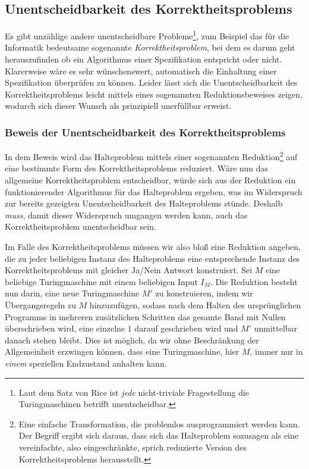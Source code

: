 \subsection{Unentscheidbarkeit des Korrektheitsproblems}
%
Es gibt unzählige andere unentscheidbare Probleme\footnote{Laut dem Satz von Rice ist \emph{jede} nicht-triviale Fragestellung die Turingmaschinen betrifft unentscheidbar.}, zum Beispiel das für die Informatik bedeutsame sogenannte \emph{Korrektheitsproblem}, bei dem es darum geht herauszufinden ob ein Algorithmus einer Spezifikation entspricht oder nicht. Klarerweise wäre es sehr wünschenswert, automatisch die Einhaltung einer Spezifikation überprüfen zu können. Leider lässt sich die Unentscheidbarkeit des Korrektheitsproblems leicht mittels eines sogenannten Reduktionsbeweises zeigen, wodurch sich dieser Wunsch als prinzipiell unerfüllbar erweist.

\subsubsection{Beweis der Unentscheidbarkeit des Korrektheitsproblems}
%
In dem Beweis wird das Halteproblem mittels einer sogenannten Reduktion\footnote{Eine einfache Transformation, die problemlos ausprogrammiert werden kann. Der Begriff ergibt sich daraus, dass sich das Halteproblem sozusagen als eine vereinfachte, also eingeschränkte, sprich reduzierte Version des Korrektheitsproblems herausstellt.} auf eine bestimmte Form des Korrektheitsproblems reduziert. Wäre nun das allgemeine Korrektheitsproblem entscheidbar, würde sich aus der Reduktion ein funktionierender Algorithmus für das Halteproblem ergeben, was im Widerspruch zur bereits gezeigten Unentscheidbarkeit des Halteproblems stünde. Deshalb \emph{muss}, damit dieser Widerspruch umgangen werden kann, auch das Korrektheitsproblem unentscheidbar sein.

Im Falle des Korrektheitsproblems müssen wir also bloß eine Reduktion angeben, die zu jeder beliebigen Instanz des Halteproblems eine entsprechende Instanz des Korrektheitsproblems mit gleicher Ja/Nein Antwort konstruiert. Sei $M$ eine beliebige Turingmaschine mit einem beliebigen Input $I_M$. Die Reduktion besteht nun darin, eine neue Turingmaschine $M'$ zu konstruieren, indem wir Übergangsregeln zu $M$ hinzuzufügen, sodass nach dem Halten des ursprünglichen Programms in mehreren zusätzlichen Schritten das gesamte Band mit Nullen überschrieben wird, eine einzelne $1$ darauf geschrieben wird und $M'$ unmittelbar danach stehen bleibt. Dies ist möglich, da wir ohne Beschränkung der Allgemeinheit erzwingen können, dass eine Turingmaschine, hier $M$, immer nur in \emph{einem} speziellen Endzustand anhalten kann.

